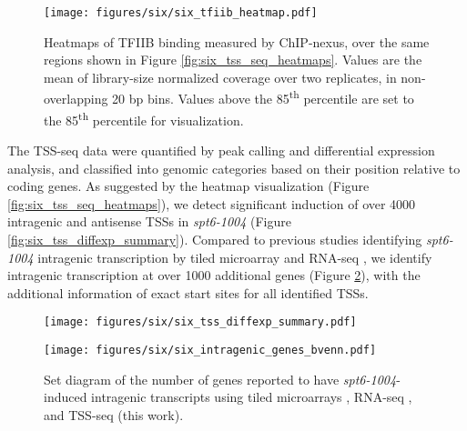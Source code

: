 \begin{figure}[h]
    \centering
    \texttt{[image: figures/six/six\_tfiib\_heatmap.pdf]}
    \caption[Heatmaps of TFIIB ChIP-nexus protection from wild-type and \textit{spt6-1004} cells, over non-overlapping coding genes]{Heatmaps of TFIIB binding measured by ChIP-nexus, over the same regions shown in Figure \ref{fig:six_tss_seq_heatmaps}. Values are the mean of library-size normalized coverage over two replicates, in non-overlapping 20 bp bins. Values above the 85\textsuperscript{th} percentile are set to the 85\textsuperscript{th} percentile for visualization.}
    \label{fig:six_tfiib_heatmap}
\end{figure}

The TSS-seq data were quantified by peak calling and differential expression analysis, and classified into genomic categories based on their position relative to coding genes.
As suggested by the heatmap visualization (Figure \ref{fig:six_tss_seq_heatmaps}), we detect significant induction of over 4000 intragenic and antisense TSSs in \textit{spt6-1004} (Figure \ref{fig:six_tss_diffexp_summary}).
Compared to previous studies identifying \textit{spt6-1004} intragenic transcription by tiled microarray and RNA-seq \citep{cheung2008, uwimana2017}, we identify intragenic transcription at over 1000 additional genes (Figure \ref{fig:six_intragenic_genes_bvenn}), with the additional information of exact start sites for all identified TSSs.

\begin{figure}[h]
    \centering
    \begin{minipage}[t]{2.875in}
        \centering
        \texttt{[image: figures/six/six\_tss\_diffexp\_summary.pdf]}
        \caption[Bar plot of the number of TSS-seq peaks in various genomic classes detected as differentially expressed in \textit{spt6-1004} versus wild-type.]{Bar plot of the number of TSS-seq peaks detected as differentially expressed in \textit{spt6-1004} versus wild-type, both after 80 minutes at 37\textdegree C. The height of each bar is proportional to the total number of peaks in the category, including those not found to be significantly differentially expressed.}
        \label{fig:six_tss_diffexp_summary}
    \end{minipage}\hfill
    \begin{minipage}[t]{2.875in}
        \centering
        \texttt{[image: figures/six/six\_intragenic\_genes\_bvenn.pdf]}
        \caption[Set diagram of the number of genes with \textit{spt6-1004}-induced intragenic transcripts reported by studies using tiled microarrays, RNA-seq, and our TSS-seq data.]{Set diagram of the number of genes reported to have \textit{spt6-1004}-induced intragenic transcripts using tiled microarrays \citep{cheung2008}, RNA-seq \citep{uwimana2017}, and TSS-seq (this work).}
        \label{fig:six_intragenic_genes_bvenn}
    \end{minipage}
\end{figure}

